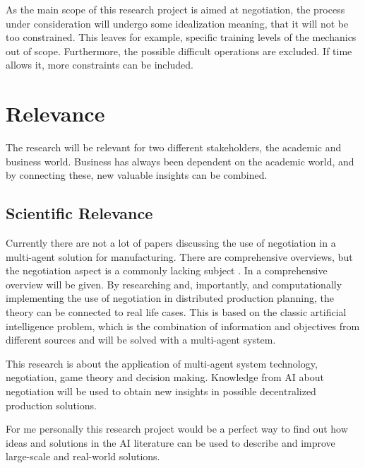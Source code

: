 As the main scope of this research project is aimed at negotiation, the process under consideration will undergo some idealization meaning, that it will not be too constrained. This leaves for example, specific training levels of the mechanics out of scope. Furthermore, the possible difficult operations are excluded.  If time allows it, more constraints can be included.

%

\section{Relevance}%
The research will be relevant for two different stakeholders, the academic and business world. Business has always been dependent on the academic world, and by connecting these, new valuable insights can be combined.
\subsection{Scientific Relevance}
Currently there are not a lot of papers discussing the use of negotiation in a multi-agent solution for manufacturing. There are comprehensive overviews, but the negotiation aspect is a commonly lacking subject \citep{leitao2009agent}. In  a comprehensive overview will be given. By researching and, importantly, and computationally implementing the use of negotiation in distributed production planning, the theory can be connected to real life cases. This is based on the classic artificial intelligence problem, which is the combination of information and objectives from different sources and will be solved with a multi-agent system. 

This research is about the application of multi-agent system technology, negotiation, game theory and decision making. Knowledge from AI about negotiation will be used to obtain new insights in possible decentralized production solutions.  

For me personally this research project would be a perfect way to find out how ideas and solutions in the AI literature can be used to describe and improve large-scale and real-world solutions.
